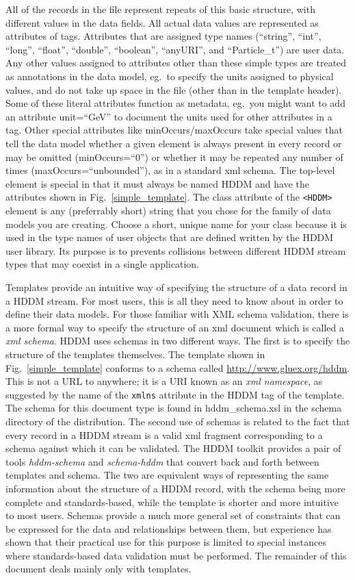 \documentclass{revtex4}
\begin{document}
All of the records in the file represent repeats of this basic structure, with 
different values in the data fields. All actual data values are represented as
attributes of tags. Attributes that are assigned type names (``string'', ``int'',
``long'', ``float'', ``double'', ``boolean'', ``anyURI'', and ``Particle\_t'')
are user data. Any other values assigned to attributes other than these simple
types are treated as annotations in the data model, eg.\ to specify the units
assigned to physical values, and do not take up space in the file (other than
in the template header). Some of these literal attributes function as metadata,
eg.\ you might want to add an attribute unit=``GeV'' to document the units used
for other attributes in a tag. Other special attributes like minOccurs/maxOccurs
take special values that tell the data model whether a given element is always
present in every record or may be omitted (minOccurs=``0'') or whether it may
be repeated any number of times (maxOccurs=``unbounded''), as in a standard
xml schema. The top-{}level element is special in that it must always be named
HDDM and have the attributes shown in Fig.~\ref{simple_template}. The class
attribute of the \texttt{<HDDM>} element is any (preferrably short) string that
you chose for the family of data models you are creating. Choose a short, unique
name for your class because it is used in the type names of user objects that are
defined written by the HDDM user library. Its purpose is to prevents collisions
between different HDDM stream types that may coexist in a single application.

Templates provide an intuitive way of specifying the structure of a data record
in a HDDM stream. For most users, this is all they need to know about in order
to define their data models. For those familiar with XML schema validation,
there is a more formal way to specify the structure of an xml document which is
called a {\em xml schema}. HDDM uses schemas in two different ways. The first
is to specify the structure of the templates themselves. The template shown in
Fig.~\ref{simple_template} conforms to a schema called \url{http://www.gluex.org/hddm}.
This is not a URL to anywhere; it is a URI known as an {\em xml namespace}, as
suggested by the name of the \texttt{xmlns} attribute in the HDDM tag of the template.
The schema for this document type is found in hddm\_schema.xsl in the schema
directory of the distribution. The second use of schemas is related to the fact
that every record in a HDDM stream is a valid xml fragment corresponding to a
schema against which it can be validated. The HDDM toolkit provides a pair of
tools {\em hddm-{}schema} and {\em schema-{}hddm} that convert back and forth
between templates and schema. The two are equivalent ways of representing the
same information about the structure of a HDDM record, with the schema being
more complete and standards-{}based, while the template is shorter and more 
intuitive to most users. Schemas provide a much more general set of constraints
that can be expressed for the data and relationships between them, but 
experience has shown that their practical use for this purpose is limited to
special instances where standards-based data validation must be performed.
The remainder of this document deals mainly only with templates.
\end{document}
